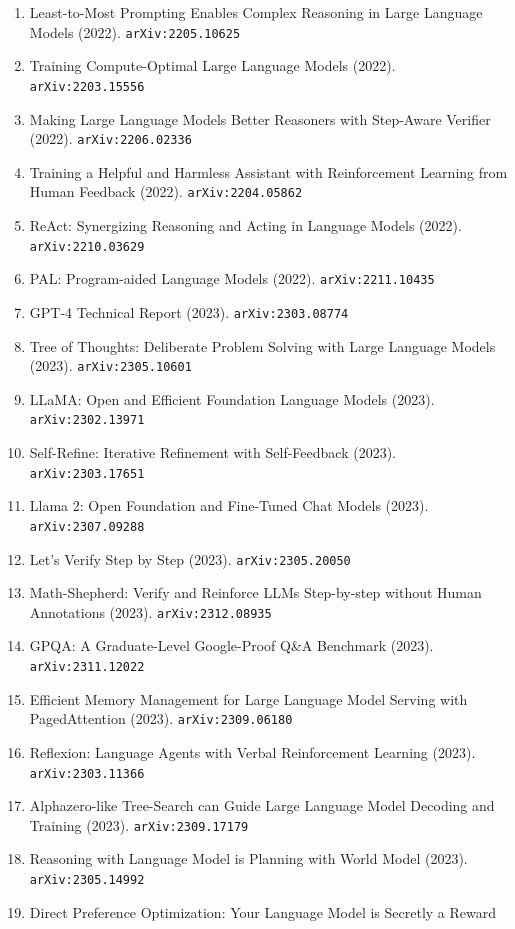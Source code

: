 \documentclass[11pt]{article}
\begin{document}
\begin{enumerate}
  \item Least-to-Most Prompting Enables Complex Reasoning in Large Language
  Models (2022). \texttt{arXiv:2205.10625}
  \item Training Compute-Optimal Large Language Models (2022). \texttt{arXiv:2203.15556}
  \item Making Large Language Models Better Reasoners with Step-Aware Verifier (2022). \texttt{arXiv:2206.02336}
  \item Training a Helpful and Harmless Assistant with Reinforcement Learning
  from Human Feedback (2022). \texttt{arXiv:2204.05862}
  \item ReAct: Synergizing Reasoning and Acting in Language Models (2022). \texttt{arXiv:2210.03629}
  \item PAL: Program-aided Language Models (2022). \texttt{arXiv:2211.10435}
  \item GPT-4 Technical Report (2023). \texttt{arXiv:2303.08774}
  \item Tree of Thoughts: Deliberate Problem Solving with Large Language Models (2023). \texttt{arXiv:2305.10601}
  \item LLaMA: Open and Efficient Foundation Language Models (2023). \texttt{arXiv:2302.13971}
  \item Self-Refine: Iterative Refinement with Self-Feedback (2023). \texttt{arXiv:2303.17651}
  \item Llama 2: Open Foundation and Fine-Tuned Chat Models (2023). \texttt{arXiv:2307.09288}
  \item Let's Verify Step by Step (2023). \texttt{arXiv:2305.20050}
  \item Math-Shepherd: Verify and Reinforce LLMs Step-by-step without Human
  Annotations (2023). \texttt{arXiv:2312.08935}
  \item GPQA: A Graduate-Level Google-Proof Q\&A Benchmark (2023). \texttt{arXiv:2311.12022}
  \item Efficient Memory Management for Large Language Model Serving with
  PagedAttention (2023). \texttt{arXiv:2309.06180}
  \item Reflexion: Language Agents with Verbal Reinforcement Learning (2023). \texttt{arXiv:2303.11366}
  \item Alphazero-like Tree-Search can Guide Large Language Model Decoding and
  Training (2023). \texttt{arXiv:2309.17179}
  \item Reasoning with Language Model is Planning with World Model (2023). \texttt{arXiv:2305.14992}
  \item Direct Preference Optimization: Your Language Model is Secretly a Reward

\end{enumerate}
\end{document}
